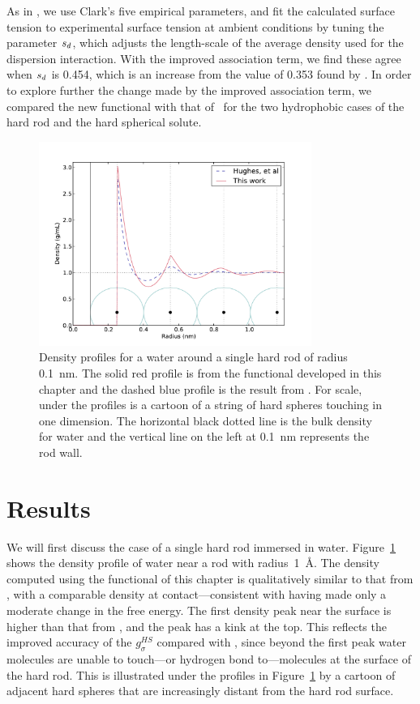 As in \hughesetal, we use Clark's five empirical parameters, and fit
the calculated surface tension to experimental surface tension at
ambient conditions by tuning the parameter $s_d$, which adjusts
the length-scale of the average density used for the dispersion
interaction.  With the improved association term, we find these agree
when $s_d$ is 0.454, which is an increase from the value of 0.353
found by \hughesetal.  In order to explore further the change made by
the improved association term, we compared the new functional with
that of \hughesetal\ for the two hydrophobic cases of the hard rod and
the hard spherical solute.

\begin{figure}
\begin{center}
\includegraphics[width=3.5in]{figs/density-compare}
\end{center}
\caption{ Density profiles for a water around a single hard rod
  of radius 0.1~nm. The solid red profile is from the functional
  developed in this chapter and the dashed blue profile is the result
  from \hughesetal.  For scale, under the profiles
  is a cartoon of a string of hard spheres touching in one
  dimension. The horizontal black dotted line is the bulk density for
  water and the vertical line on the left at 0.1~nm represents the
  rod wall.}
\label{fig:density-single-rod}
\end{figure}

\section{Results}

We will first discuss the case of a single hard rod immersed in
water. Figure~\ref{fig:density-single-rod} shows the density profile
of water near a rod with radius~1~\AA.  The density computed using the
functional of this chapter is qualitatively similar to that from
\hughesetal, with a comparable density at contact---consistent with
having made only a moderate change in the free energy.  The first
density peak near the surface is higher than that from \hughesetal,
and the peak has a kink at the top.  This reflects the improved
accuracy of the $g_\sigma^\textit{HS}$ compared with \hughesetal,
since beyond the first peak water molecules are unable to touch---or
hydrogen bond to---molecules at the surface of the hard rod. This is
illustrated under the profiles in Figure~\ref{fig:density-single-rod}
by a cartoon of adjacent hard spheres that are increasingly distant
from the hard rod surface.

